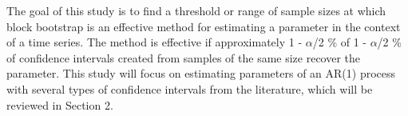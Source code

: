 \documentclass[12pt, letterpaper, titlepage]{article}
\begin{document}
The goal of this study is to find a threshold or range of sample sizes at which block bootstrap 
is an effective method for estimating a parameter in the context of a time series. The method is effective if approximately 1 - $\alpha$/2 \% of 1 - $\alpha$/2 \% of confidence intervals created from samples of the same size recover the parameter. This study will focus on estimating parameters of an AR(1) process with several types of confidence intervals from the literature, \citep{diciccio1996bootstrap}  \citep{rice2006mathematical} which will be reviewed in Section 2.




\end{document}
